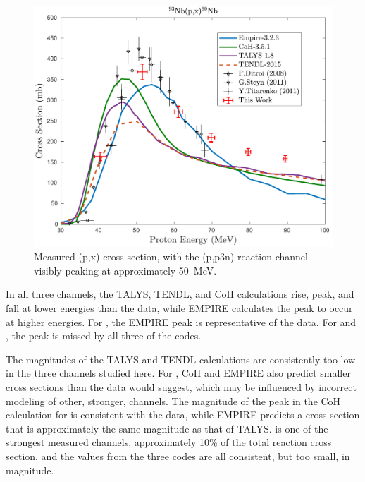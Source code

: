 \begin{figure}
 \centering
 \includegraphics[width=0.5\linewidth]{./figures/90Nb.pdf}
 \caption{Measured (p,x) cross section, with the (p,p3n) reaction channel visibly peaking at approximately \mbox{50 MeV}.}
 \label{fig:90Nb}
\end{figure}




In all three channels, the TALYS, TENDL, and CoH calculations rise, peak, and fall at lower energies than the data, while EMPIRE calculates the peak to occur at higher energies.
For , the EMPIRE peak is representative of the data.
For  and , the peak is missed by all three  of the codes.


The magnitudes of the TALYS and TENDL calculations are consistently too low in the three channels studied here. 
For , CoH and EMPIRE also predict smaller cross sections than the data would suggest, which may be influenced by incorrect modeling of other, stronger, channels.
The magnitude of the peak in the CoH calculation for   is consistent  with the data, while EMPIRE predicts a cross section that is approximately the same magnitude as that of TALYS.
 is one of the strongest measured channels, approximately 10\% of the total reaction cross section, and the values from the three codes are all consistent, but  too small, in magnitude.



          





